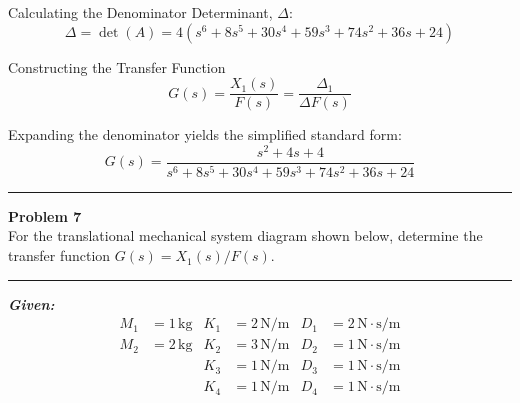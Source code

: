\documentclass[11pt]{article}
\newcommand{\hspring}[2]{%
      \draw[spring] (#1) -- ++(2,0) node[midway, above=0.25cm]{#2};
    }
\newcommand{\hdamper}[2]{%
      \begin{scope}[shift={#1}]
        \draw (0,0) -- (0.5,0);                  %
        \draw (0.5,0) -- (0.5,0.3) -- (1.5,0.3);  %
        \draw (0.5,0) -- (0.5,-0.3) -- (1.5,-0.3);%
        
        \draw (1.0,0) -- (1.0,0.15);
        \draw (1.0,0) -- (1.0,-0.15);
        
        \draw (1.0,0) -- (2.0,0);
    
        \node[above] at (1,0.3) {#2};
      \end{scope}
    }
\newcommand{\tbody}[4]{
    \node[tbody] (#4) at (#1) {#2};
    \node at ([yshift=20mm]#4.center) {#3};
    \draw ([yshift=11mm]#4.center) -- ([yshift=18mm]#4.center);
    \draw[->] ([yshift=16mm, xshift=-4mm]#4.center) -- ([yshift=16mm, xshift=5mm]#4.center);
    }
\begin{document}
{Calculating the Denominator Determinant, $\Delta$}:
$$\Delta = \det(A) = 4(s^6 + 8s^5 + 30s^4 + 59s^3 + 74s^2 + 36s + 24)$$

{Constructing the Transfer Function}
$$G(s) = \frac{X_1(s)}{F(s)} = \frac{\Delta_1}{\Delta F(s)}$$

Expanding the denominator yields the simplified standard form:
\[
\boxed{
G(s) = \frac{s^2 + 4s + 4}{s^6 + 8s^5 + 30s^4 + 59s^3 + 74s^2 + 36s + 24}
}
\]


\newpage
  \setcounter{page}{2}  
\noindent\rule{\textwidth}{1pt}
\noindent\textbf{Problem 7} \hfill
\\For the translational mechanical system diagram shown below, determine the transfer function $G(s)=X_1(s)/F(s)$.

\begin{center}
\end{center}

\noindent\rule{\textwidth}{1pt}

\vspace{12pt}

\noindent \textbf{\textit{Given:}}
\[
\begin{aligned}
M_1 &= 1\, \text{kg} & K_1 &= 2\, \text{N/m} & D_1 &= 2\, \text{N}\cdot\text{s/m} \\
M_2 &= 2\, \text{kg} & K_2 &= 3\, \text{N/m} & D_2 &= 1\, \text{N}\cdot\text{s/m} \\
& & K_3 &= 1\, \text{N/m} & D_3 &= 1\, \text{N}\cdot\text{s/m} \\
& & K_4 &= 1\, \text{N/m} & D_4 &= 1\, \text{N}\cdot\text{s/m}
\end{aligned}
\]
\end{document}
